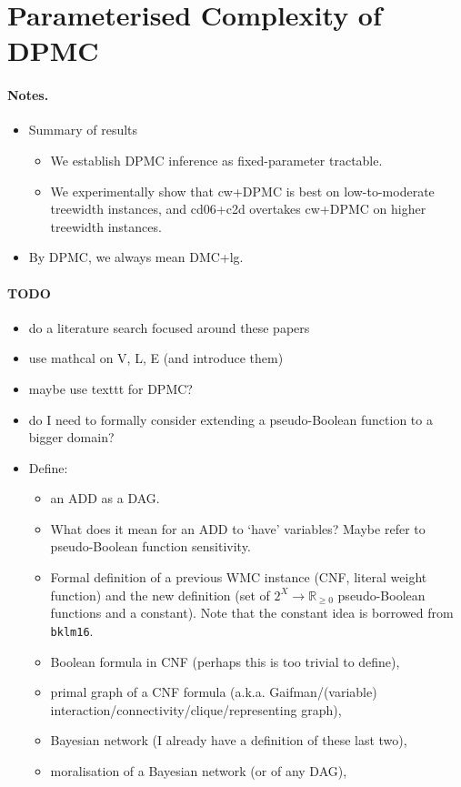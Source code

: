 \documentclass{article}
\theoremstyle{definition}
\theoremstyle{remark}
\begin{document}
\section{Parameterised Complexity of DPMC}

\paragraph{Notes.}
\begin{itemize}
\item Summary of results
  \begin{itemize}
  \item We establish DPMC inference as fixed-parameter tractable.
  \item We experimentally show that cw+DPMC is best on low-to-moderate treewidth
    instances, and cd06+c2d overtakes cw+DPMC on higher treewidth instances.
  \end{itemize}
\item By DPMC, we always mean DMC+lg.
\end{itemize}

\paragraph{TODO}
\begin{itemize}
\item do a literature search focused around these papers
\item use mathcal on V, L, E (and introduce them)
\item maybe use texttt for DPMC?
\item do I need to formally consider extending a pseudo-Boolean function to a
  bigger domain?
\item Define:
  \begin{itemize}
  \item an ADD as a DAG.
  \item What does it mean for an ADD to `have' variables? Maybe refer to
    pseudo-Boolean function sensitivity.
  \item Formal definition of a previous WMC instance (CNF, literal weight
    function) and the new definition (set of $2^{X} \to \mathbb{R}_{\ge 0}$
    pseudo-Boolean functions and a constant). Note that the constant idea is
    borrowed from \texttt{bklm16}.
  \item Boolean formula in CNF (perhaps this is too trivial to define),
  \item primal graph of a CNF formula (a.k.a.
    Gaifman/(variable) interaction/connectivity/clique/representing graph),
  \item Bayesian network (I already have a definition of these last two),
  \item moralisation of a Bayesian network (or of any DAG),
  \end{itemize}
\end{itemize}
\end{document}
